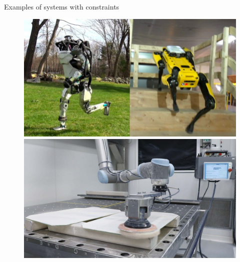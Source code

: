 \documentclass{beamer}
\begin{document}
\begin{frame}{Examples of systems with constraints}
\begin{flushleft}

\begin{figure}
\centering
\begin{minipage}{.5\textwidth}
  \centering
  \includegraphics[width=.9\linewidth]{pic1.jpg}
\end{minipage}%
\begin{minipage}{.5\textwidth}
  \centering
  \includegraphics[width=.9\linewidth]{pic2.jpg}
\end{minipage}
\end{figure}

\end{flushleft}
\end{frame}
\end{document}
